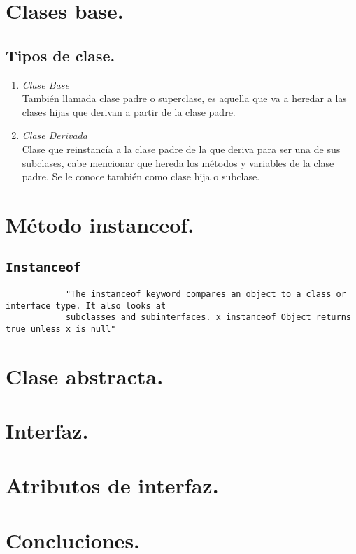 \documentclass[conference]{IEEEtran}
\begin{document}
    \subsection{}
\section{Clases base.}

    \subsection{Tipos de clase.}

    \begin{enumerate}
        
        \item \textit{Clase Base}\\
            También llamada clase padre o superclase, es aquella que va a heredar a las clases hijas que derivan a partir de la clase padre.
        
        \item \textit{Clase Derivada}\\
            Clase que reinstancía a la clase padre de la que deriva para ser una de sus subclases, cabe mencionar que hereda los métodos y variables de la clase padre.
            Se le conoce también como clase hija o subclase.

    \end{enumerate}

\section{Método instanceof.}

    \subsection{\texttt{Instanceof}}
        
        \begin{verbatim}
            "The instanceof keyword compares an object to a class or interface type. It also looks at
            subclasses and subinterfaces. x instanceof Object returns true unless x is null"
        \end{verbatim}

\section{Clase abstracta.}

\section{Interfaz.}

\section{Atributos de interfaz.}

    
\section{Concluciones.}
    \subsection{}
\end{document}
